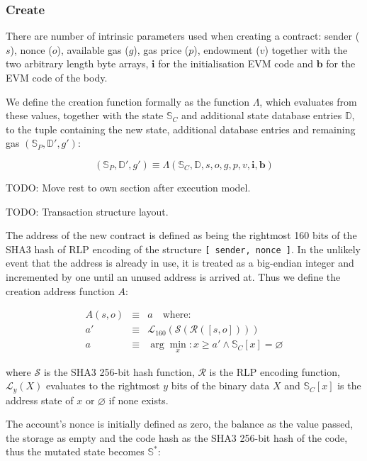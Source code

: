 \documentclass[9pt,oneside]{amsart}
\begin{document}
\begin{multicols}{2}
\subsubsection{Create} \label{ch:create}

There are number of intrinsic parameters used when creating a contract: sender ($s$), nonce ($o$), available gas ($g$), gas price ($p$), endowment ($v$) together with the two arbitrary length byte arrays, $\mathbf{i}$ for the initialisation EVM code and $\mathbf{b}$ for the EVM code of the body.

We define the creation function formally as the function $\Lambda$, which evaluates from these values, together with the state $\mathbb{S}_C$ and additional state database entries $\mathbb{D}$, to the tuple containing the new state, additional database entries and remaining gas $(\mathbb{S}_P, \mathbb{D}', g')$:

\begin{equation}
(\mathbb{S}_P, \mathbb{D}', g') \equiv \Lambda(\mathbb{S}_C, \mathbb{D}, s, o, g, p, v, \mathbf{i}, \mathbf{b})
\end{equation}

TODO: Move rest to own section after execution model.

TODO: Transaction structure layout.

The address of the new contract is defined as being the rightmost 160 bits of the SHA3 hash of RLP encoding of the structure \texttt{[ sender, nonce ]}. In the unlikely event that the address is already in use, it is treated as a big-endian integer and incremented by one until an unused address is arrived at. Thus we define the creation address function $A$:

\begin{eqnarray}
A(s, o) & \equiv & a \quad \text{where:} \\
a' & \equiv & \mathcal{L}_{160}(\mathcal{S}(\mathcal{R}([s, o]))) \\
a & \equiv & \arg \min_x : x \geqslant a' \wedge \mathbb{S}_C[x] = \varnothing
\end{eqnarray}

where $\mathcal{S}$ is the SHA3 256-bit hash function, $\mathcal{R}$ is the RLP encoding function, $\mathcal{L}_y(X)$ evaluates to the rightmost $y$ bits of the binary data $X$ and $\mathbb{S}_C[x]$ is the address state of $x$ or $\varnothing$ if none exists.

The account's nonce is initially defined as zero, the balance as the value passed, the storage as empty and the code hash as the SHA3 256-bit hash of the code, thus the mutated state becomes $\mathbb{S}^*$:


\end{multicols}
\end{document}
